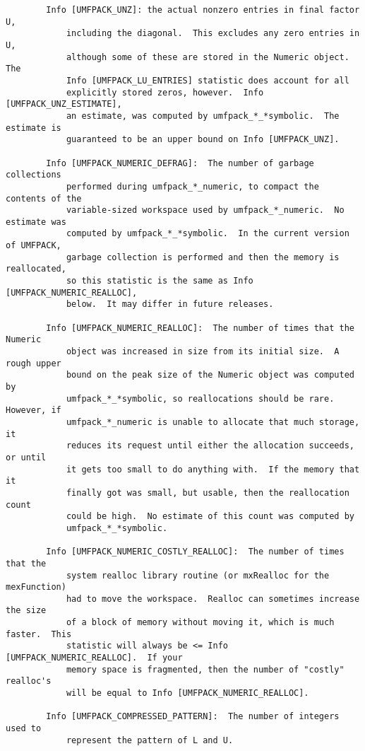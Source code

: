 \documentclass[11pt]{article}
\begin{document}
{\begin{verbatim}
        Info [UMFPACK_UNZ]: the actual nonzero entries in final factor U,
            including the diagonal.  This excludes any zero entries in U,
            although some of these are stored in the Numeric object.  The
            Info [UMFPACK_LU_ENTRIES] statistic does account for all
            explicitly stored zeros, however.  Info [UMFPACK_UNZ_ESTIMATE],
            an estimate, was computed by umfpack_*_*symbolic.  The estimate is
            guaranteed to be an upper bound on Info [UMFPACK_UNZ].

        Info [UMFPACK_NUMERIC_DEFRAG]:  The number of garbage collections
            performed during umfpack_*_numeric, to compact the contents of the
            variable-sized workspace used by umfpack_*_numeric.  No estimate was
            computed by umfpack_*_*symbolic.  In the current version of UMFPACK,
            garbage collection is performed and then the memory is reallocated,
            so this statistic is the same as Info [UMFPACK_NUMERIC_REALLOC],
            below.  It may differ in future releases.

        Info [UMFPACK_NUMERIC_REALLOC]:  The number of times that the Numeric
            object was increased in size from its initial size.  A rough upper
            bound on the peak size of the Numeric object was computed by
            umfpack_*_*symbolic, so reallocations should be rare.  However, if
            umfpack_*_numeric is unable to allocate that much storage, it
            reduces its request until either the allocation succeeds, or until
            it gets too small to do anything with.  If the memory that it
            finally got was small, but usable, then the reallocation count
            could be high.  No estimate of this count was computed by
            umfpack_*_*symbolic.

        Info [UMFPACK_NUMERIC_COSTLY_REALLOC]:  The number of times that the
            system realloc library routine (or mxRealloc for the mexFunction)
            had to move the workspace.  Realloc can sometimes increase the size
            of a block of memory without moving it, which is much faster.  This
            statistic will always be <= Info [UMFPACK_NUMERIC_REALLOC].  If your
            memory space is fragmented, then the number of "costly" realloc's
            will be equal to Info [UMFPACK_NUMERIC_REALLOC].

        Info [UMFPACK_COMPRESSED_PATTERN]:  The number of integers used to
            represent the pattern of L and U.


\end{verbatim}}
\end{document}
